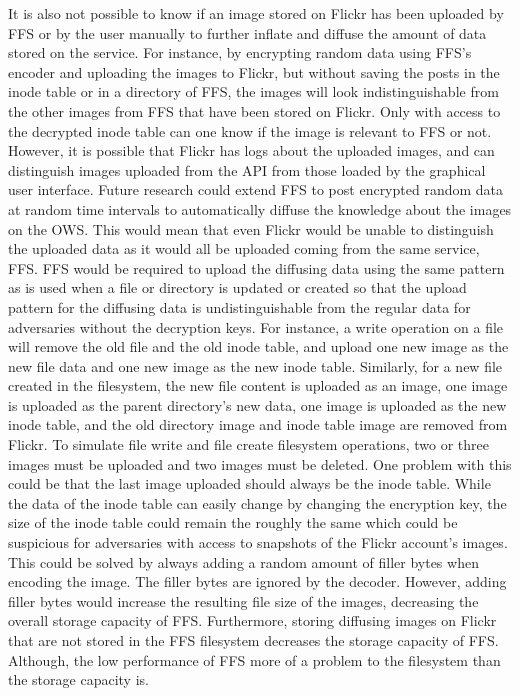 It is also not possible to know if an image stored on Flickr has been uploaded by \gls{FFS} or by the user manually to further inflate and diffuse the amount of data stored on the service. For instance, by encrypting random data using \gls{FFS}'s encoder and uploading the images to Flickr, but without saving the posts in the inode table or in a directory of \gls{FFS}, the images will look indistinguishable from the other images from \gls{FFS} that have been stored on Flickr. Only with access to the decrypted inode table can one know if the image is relevant to \gls{FFS} or not. However, it is possible that Flickr has logs about the uploaded images, and can distinguish images uploaded from the \gls{API} from those loaded by the graphical user interface. Future research could extend \gls{FFS} to post encrypted random data at random time intervals to automatically diffuse the knowledge about the images on the \gls{OWS}. This would mean that even Flickr would be unable to distinguish the uploaded data as it would all be uploaded coming from the same service, \ie \gls{FFS}. \gls{FFS} would be required to upload the diffusing data using the same pattern as is used when a file or directory is updated or created so that the upload pattern for the diffusing data is undistinguishable from the regular data for adversaries without the decryption keys. For instance, a write operation on a file will remove the old file and the old inode table, and upload one new image as the new file data and one new image as the new inode table. Similarly, for a new file created in the filesystem, the new file content is uploaded as an image, one image is uploaded as the parent directory's new data, one image is uploaded as the new inode table, and the old directory image and inode table image are removed from Flickr. To simulate file write and file create filesystem operations, two or three images must be uploaded and two images must be deleted. One problem with this could be that the last image uploaded should always be the inode table. While the data of the inode table can easily change by changing the encryption key, the size of the inode table could remain the roughly the same which could be suspicious for adversaries with access to snapshots of the Flickr account's images. This could be solved by always adding a random amount of filler bytes when encoding the image. The filler bytes are ignored by the decoder. However, adding filler bytes would increase the resulting file size of the images, decreasing the overall storage capacity of \gls{FFS}. Furthermore, storing diffusing images on Flickr that are not stored in the \gls{FFS} filesystem decreases the storage capacity of \gls{FFS}. Although, the low performance of \gls{FFS} more of a problem to the filesystem than the storage capacity is.

